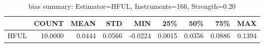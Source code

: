 \begin{table}[ht]
\centering
\caption{bias summary: Estimator=HFUL, Instruments=166, Strength=0.20}
\begin{tabular}{lrrrrrrrr}
\toprule
 & COUNT & MEAN & STD & MIN & 25\% & 50\% & 75\% & MAX \\
\midrule
HFUL & 10.0000 & 0.0444 & 0.0566 & -0.0224 & 0.0015 & 0.0356 & 0.0886 & 0.1394 \\
\bottomrule
\end{tabular}
\end{table}
